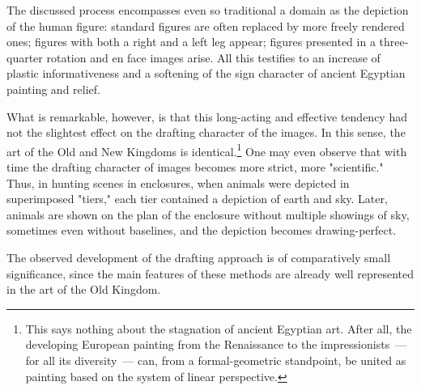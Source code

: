 
The discussed process encompasses even so traditional a domain as the depiction of the
human figure: standard figures are often replaced by more freely rendered ones; figures
with both a right and a left leg appear; figures presented in a three-quarter rotation and
en face images arise. All this testifies to an increase of plastic informativeness and a
softening of the sign character of ancient Egyptian painting and relief.

What is remarkable, however, is that this long-acting and effective tendency had not
the slightest effect on the drafting character of the images. In this sense, the art of the
Old and New Kingdoms is identical.\footnote{%
  This says nothing about the stagnation of ancient Egyptian art. After all, the
  developing European painting from the Renaissance to the impressionists~--- for all
  its diversity~--- can, from a formal-geometric standpoint, be united as painting based
  on the system of linear perspective.}
One may even observe that with time the drafting character of images becomes more
strict, more "scientific." Thus, in hunting scenes in enclosures, when animals were
depicted in superimposed "tiers," each tier contained a depiction of earth and sky.
Later, animals are shown on the plan of the enclosure without multiple showings of sky,
sometimes even without baselines, and the depiction becomes drawing-perfect.

The observed development of the drafting approach is of comparatively small
significance, since the main features of these methods are already well represented in
the art of the Old Kingdom.

